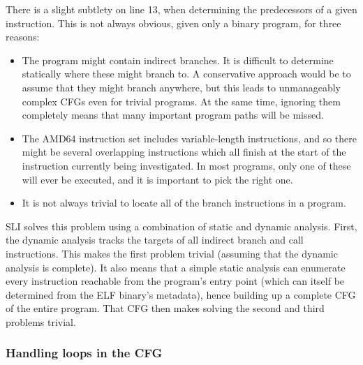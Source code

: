 There is a slight subtlety on line 13, when determining the predecessors of a given instruction.
This is not always obvious, given only a binary program, for three reasons:

\begin{itemize}
\item
  The program might contain indirect branches.
  It is difficult to determine statically where these might branch to.
  A conservative approach would be to assume that they might branch anywhere, but this leads to unmanageably complex CFGs even for trivial programs.
  At the same time, ignoring them completely means that many important program paths will be missed.
\item
  The AMD64 instruction set includes variable-length instructions, and so there might be several overlapping instructions which all finish at the start of the instruction currently being investigated.
  In most programs, only one of these will ever be executed, and it is important to pick the right one.
\item
  It is not always trivial to locate all of the branch instructions in a program.
\end{itemize}

SLI solves this problem using a combination of static and dynamic analysis.
First, the dynamic analysis tracks the targets of all indirect branch and call instructions.
This makes the first problem trivial (assuming that the dynamic analysis is complete).
It also means that a simple static analysis can enumerate every instruction reachable from the program's entry point (which can itself be determined from the ELF binary's metadata), hence building up a complete CFG of the entire program.
That CFG then makes solving the second and third problems trivial.




\subsubsection{Handling loops in the CFG}

